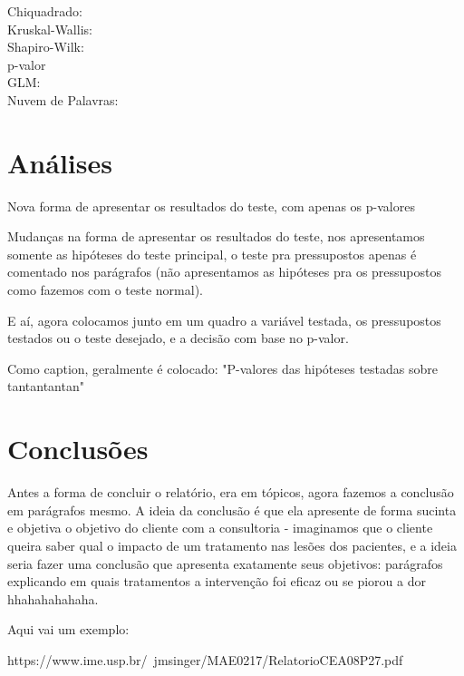 \documentclass[a4paper, 12pt]{article} %
\begin{document}
Chiquadrado:\\
Kruskal-Wallis:\\
Shapiro-Wilk:\\
p-valor\\
GLM:\\
Nuvem de Palavras:\\

\section{Análises}

\begin{quadro}[H]
\centering
\caption{Nova forma de apresentar os resultados do teste, com apenas os p-valores}
\label{R-Q-Teste-1}
\vspace{0.1cm}
\end{quadro}

Mudanças na forma de apresentar os resultados do teste, nos apresentamos somente as hipóteses do teste principal, o teste pra pressupostos apenas é comentado nos parágrafos (não apresentamos as hipóteses pra os pressupostos como fazemos com o teste normal).

E aí, agora colocamos junto em um quadro a variável testada, os pressupostos testados ou o teste desejado, e a decisão com base no p-valor.

Como caption, geralmente é colocado: "P-valores das hipóteses testadas sobre tantantantan"

\section{Conclusões}

Antes a forma de concluir o relatório, era em tópicos, agora fazemos a conclusão em parágrafos mesmo. A ideia da conclusão é que ela apresente de forma sucinta e objetiva o objetivo do cliente com a consultoria - imaginamos que o cliente queira saber qual o impacto de um tratamento nas lesões dos pacientes, e a ideia seria fazer uma conclusão que apresenta exatamente seus objetivos: parágrafos explicando em quais tratamentos a intervenção foi eficaz ou se piorou a dor hhahahahahaha.

Aqui vai um exemplo: 

https://www.ime.usp.br/~jmsinger/MAE0217/RelatorioCEA08P27.pdf
\end{document}
